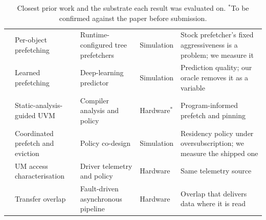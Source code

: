\begin{table}[t]
\begin{tabularx}{\textwidth}{@{}l Y Y l Y@{}}
\cite{lin2025forest} &
Per-object prefetching &
Runtime-configured tree prefetchers &
Simulation &
Stock prefetcher's fixed aggressiveness is a problem; we measure it \\

\cite{long2022dlprefetch} &
Learned prefetching &
Deep-learning predictor &
Simulation &
Prediction quality; our oracle removes it as a variable \\

\cite{pratheek2024suv} &
Static-analysis-guided UVM &
Compiler analysis and policy &
Hardware$^{\ast}$ &
Program-informed prefetch and pinning \\

\cite{yu2020cppe} &
Coordinated prefetch and eviction &
Policy co-design &
Simulation &
Residency policy under oversubscription; we measure the shipped one \\

\cite{jones2025helm} &
UM access characterisation &
Driver telemetry and policy &
Hardware &
Same telemetry source \\

\cite{jung2020hum} &
Transfer overlap &
Fault-driven asynchronous pipeline &
Hardware &
Overlap that delivers data where it is read \\

\bottomrule
\end{tabularx}
\caption{Closest prior work and the substrate each result was evaluated on.
$^{\ast}$To be confirmed against the paper before submission.}
\label{tab:prior-work}
\end{table}
